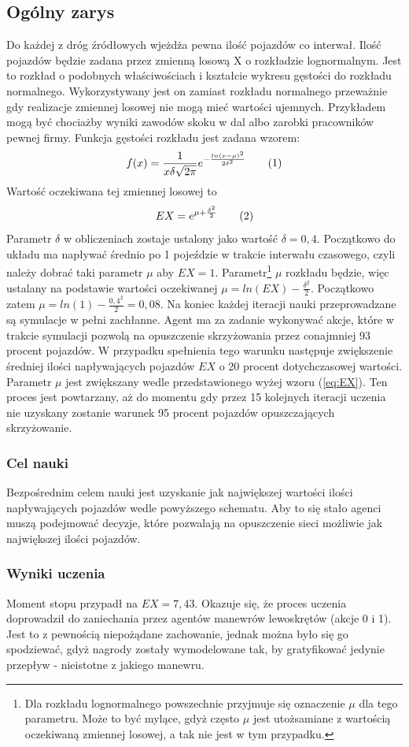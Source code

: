 \documentclass[12pt]{book}
\theoremstyle{plain}
\newcommand\addtag{\refstepcounter{equation}
\renewcommand{\labelenumii}{\theenumii}
\renewcommand{\theenumii}{\theenumi.\arabic{enumii}.}
\tag{\theequation}}
\newcommand{\myref}[1]{(\ref{#1})}
\begin{document}
\subsection*{Ogólny zarys}
Do każdej z dróg źródłowych wjeżdża pewna ilość pojazdów co interwał. Ilość pojazdów będzie zadana przez zmienną losową X o rozkładzie lognormalnym. Jest to rozkład o podobnych właściwościach i kształcie wykresu gęstości do rozkładu normalnego. Wykorzystywany jest on zamiast rozkładu normalnego przeważnie gdy realizacje zmiennej losowej nie mogą mieć wartości ujemnych. Przykładem mogą być chociażby wyniki zawodów skoku w dal albo zarobki pracowników pewnej firmy.
Funkcja gęstości rozkładu jest zadana wzorem:
\[ f(x)=\frac{1}{x\delta\sqrt{2\pi}}e^{-\frac{ln(x-\mu)^2}{2\delta^2}} \addtag \]
Wartość oczekiwana tej zmiennej losowej to \[EX=e^{\mu+\frac{\delta^2}{2}} \addtag \label{eq:EX}\] Parametr $\delta$ w obliczeniach zostaje ustalony jako wartość $\delta=0,4$. Początkowo do układu ma napływać średnio po 1 pojeździe w trakcie interwału czasowego, czyli należy dobrać taki parametr $\mu$ aby $EX=1$. Parametr\footnote{Dla rozkładu lognormalnego powszechnie przyjmuje się oznaczenie $\mu$ dla tego parametru. Może to być mylące, gdyż często $\mu$ jest utożsamiane z wartością oczekiwaną zmiennej losowej, a tak nie jest w tym przypadku. }  $\mu$ rozkładu będzie, więc ustalany na podstawie wartości oczekiwanej $\mu=ln(EX)-\frac{\delta^2}{2}$. Początkowo zatem $\mu=ln(1)-\frac{0,4^2}{2}=0,08$. \newline
Na koniec każdej iteracji nauki przeprowadzane są symulacje w pełni zachłanne. Agent ma za zadanie wykonywać akcje, które w trakcie symulacji pozwolą na opuszczenie skrzyżowania przez conajmniej 93 procent pojazdów. W przypadku spełnienia tego warunku następuje zwiększenie średniej ilości napływających pojazdów $EX$ o 20 procent dotychczasowej wartości. Parametr $\mu$ jest zwiększany wedle przedstawionego wyżej wzoru \myref{eq:EX}. Ten proces jest powtarzany, aż do momentu gdy przez 15 kolejnych iteracji uczenia nie uzyskany zostanie warunek 95 procent pojazdów opuszczających skrzyżowanie.
\subsubsection*{Cel nauki}
Bezpośrednim celem nauki jest uzyskanie jak największej wartości ilości napływających pojazdów wedle powyższego schematu. Aby to się stało agenci muszą podejmować decyzje, które pozwalają na opuszczenie sieci możliwie jak największej ilości pojazdów.
\subsubsection*{Wyniki uczenia}
Moment stopu przypadł na $EX=7,43$. Okazuje się, że proces uczenia doprowadził do zaniechania przez agentów manewrów lewoskrętów (akcje 0 i 1). Jest to z pewnością niepożądane zachowanie, jednak można było się go spodziewać, gdyż nagrody zostały wymodelowane tak, by gratyfikować jedynie przepływ - nieistotne z jakiego manewru. 
\end{document}
